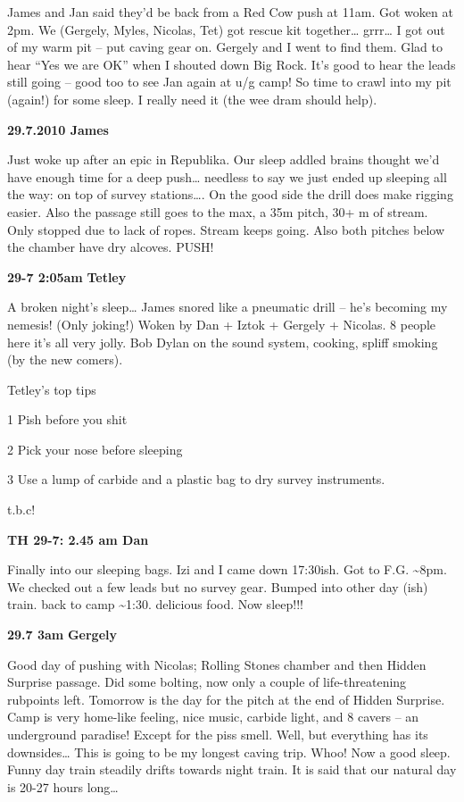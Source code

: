 James and Jan said they'd be back from a Red Cow push at 11am. Got woken
at 2pm. We (Gergely, Myles, Nicolas, Tet) got rescue kit
together\ldots{} grrr\ldots{} I got out of my warm pit -- put caving
gear on. Gergely and I went to find them. Glad to hear ``Yes we are OK''
when I shouted down Big Rock. It's good to hear the leads still going --
good too to see Jan again at u/g camp! So time to crawl into my pit
(again!) for some sleep. I really need it (the wee dram should help).

\textbf{29.7.2010 James}

Just woke up after an epic in Republika. Our sleep addled brains thought
we'd have enough time for a deep push\ldots{} needless to say we just
ended up sleeping all the way: on top of survey stations\ldots{}. On the
good side the drill does make rigging easier. Also the passage still
goes to the max, a 35m pitch, 30+ m of stream. Only stopped due to lack
of ropes. Stream keeps going. Also both pitches below the chamber have
dry alcoves. PUSH!

\textbf{29-7 2:05am} \textbf{Tetley}

A broken night's sleep\ldots{} James snored like a pneumatic drill --
he's becoming my nemesis! (Only joking!) Woken by Dan + Iztok + Gergely
+ Nicolas. 8 people here it's all very jolly. Bob Dylan on the sound
system, cooking, spliff smoking (by the new comers).

Tetley's top tips

1 Pish before you shit

2 Pick your nose before sleeping

3 Use a lump of carbide and a plastic bag to dry survey instruments.

t.b.c!

\textbf{TH 29-7: 2.45 am Dan}

Finally into our sleeping bags. Izi and I came down 17:30ish. Got to
F.G. \textasciitilde{}8pm. We checked out a few leads but no survey
gear. Bumped into other day (ish) train. back to camp
\textasciitilde{}1:30. delicious food. Now sleep!!!

\textbf{29.7 3am} \textbf{Gergely}

Good day of pushing with Nicolas; Rolling Stones chamber and then Hidden
Surprise passage. Did some bolting, now only a couple of
life-threatening rubpoints left. Tomorrow is the day for the pitch at
the end of Hidden Surprise. Camp is very home-like feeling, nice music,
carbide light, and 8 cavers -- an underground paradise! Except for the
piss smell. Well, but everything has its downsides\ldots{} This is going
to be my longest caving trip. Whoo! Now a good sleep. Funny day train
steadily drifts towards night train. It is said that our natural day is
20-27 hours long\ldots{}

